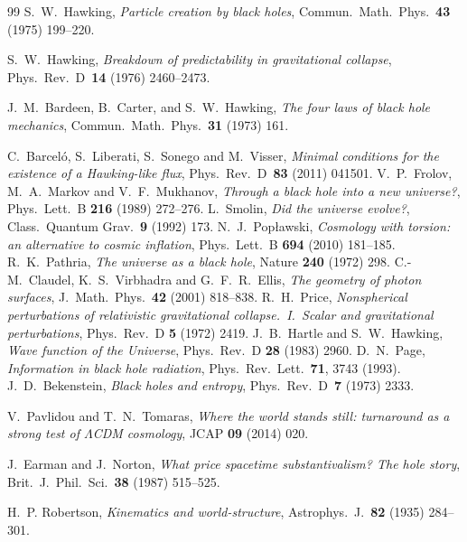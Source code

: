 \documentclass[11pt,a4paper]{article}
\theoremstyle{plain}
\theoremstyle{definition}
\theoremstyle{remark}
\begin{document}
\begin{thebibliography}{99}
S.~W.~Hawking,
\emph{Particle creation by black holes},
Commun.~Math.~Phys.~\textbf{43} (1975) 199--220.

S.~W.~Hawking,
\emph{Breakdown of predictability in gravitational collapse},
Phys.~Rev.~D~\textbf{14} (1976) 2460--2473.

J.~M.~Bardeen, B.~Carter, and S.~W.~Hawking,
\emph{The four laws of black hole mechanics}, Commun.~Math.~Phys.~\textbf{31} (1973) 161.

 C.~Barcel\'o, S.~Liberati, S.~Sonego and M.~Visser, \emph{Minimal conditions for the existence of a Hawking-like flux}, Phys.~Rev.~D~\textbf{83} (2011) 041501.
 V.~P.~Frolov, M.~A.~Markov and V.~F.~Mukhanov, \emph{Through a black hole into a new universe?}, Phys.\ Lett.\ B \textbf{216} (1989) 272--276.
 L.~Smolin, \emph{Did the universe evolve?}, Class.\ Quantum Grav.\ \textbf{9} (1992) 173.
 N.~J.~Pop\l awski, \emph{Cosmology with torsion: an alternative to cosmic inflation}, Phys.\ Lett.\ B \textbf{694} (2010) 181--185.
 R.~K.~Pathria, \emph{The universe as a black hole}, Nature \textbf{240} (1972) 298.
 C.-M.~Claudel, K.~S.~Virbhadra and G.~F.~R.~Ellis, \emph{The geometry of photon surfaces}, J.\ Math.\ Phys.\ \textbf{42} (2001) 818--838.
 R.~H.~Price, \emph{Nonspherical perturbations of relativistic gravitational collapse.\ I.\ Scalar and gravitational perturbations}, Phys.\ Rev.\ D \textbf{5} (1972) 2419.
 J.~B.~Hartle and S.~W.~Hawking, \emph{Wave function of the Universe}, Phys.\ Rev.\ D \textbf{28} (1983) 2960.
 D.~N.~Page, \emph{Information in black hole radiation}, Phys.\ Rev.\ Lett.\ \textbf{71}, 3743 (1993).
J.~D.~Bekenstein,
\emph{Black holes and entropy}, Phys.~Rev.~D~\textbf{7} (1973) 2333.

V.~Pavlidou and T.~N.~Tomaras,
\emph{Where the world stands still: turnaround as a strong test of $\Lambda$CDM cosmology}, JCAP \textbf{09} (2014) 020.

J.~Earman and J.~Norton,
\emph{What price spacetime substantivalism? The hole story},
Brit.~J.~Phil.~Sci.~\textbf{38} (1987) 515--525.

H.~P. Robertson,
\emph{Kinematics and world-structure},
Astrophys.~J.~\textbf{82} (1935) 284--301.


\end{thebibliography}
\end{document}
